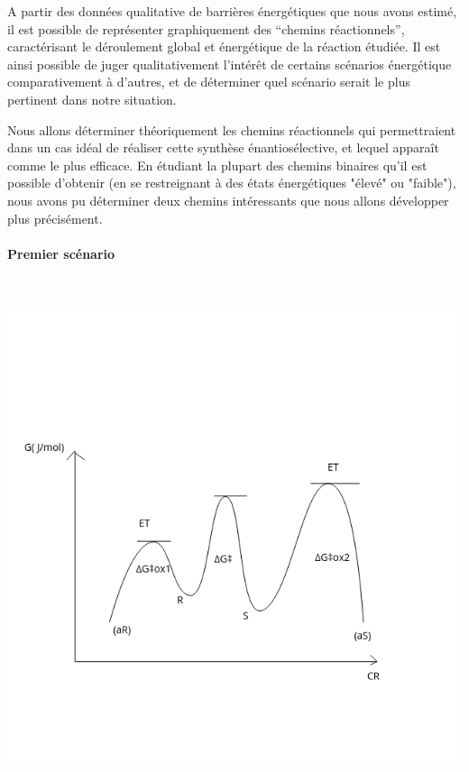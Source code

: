\documentclass{article}
\newcommand{\pparagraph}[1]{\paragraph{#1}\mbox{}\\}
\begin{document}
A partir des données qualitative de barrières énergétiques que nous avons estimé, il est possible de représenter graphiquement des “chemins réactionnels”, caractérisant le déroulement global et énergétique de la réaction étudiée.
Il est ainsi possible de juger qualitativement l'intérêt de certains scénarios énergétique comparativement à d’autres, et de déterminer quel scénario serait le plus pertinent dans notre situation.

\medbreak

Nous allons déterminer théoriquement les chemins réactionnels qui permettraient dans un cas idéal de réaliser cette synthèse énantiosélective, et lequel apparaît comme le plus efficace.  En étudiant la plupart des chemins binaires qu'il est possible d'obtenir (en se restreignant à des états énergétiques "élevé" ou "faible"), nous avons pu déterminer deux chemins intéressants que nous allons développer plus précisément.
\medbreak

\pparagraph{Premier scénario}

\begin{center}
\includegraphics[scale = 0.5]{GoodCurve}
\end{center}
\end{document}
